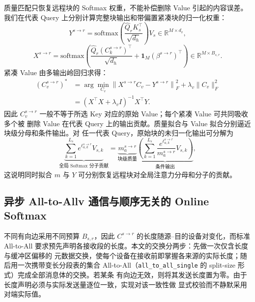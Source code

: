 \documentclass[sigconf,nonacm]{acmart}
\newcommand{\softmax}{\mathrm{softmax}}
\begin{document}
质量匹配只恢复远程块的 Softmax 权重，不能补偿删除 Value 引起的内容误差。我们在代表 Query
上分别计算完整块输出和带偏置紧凑块的归一化权重：
\begin{equation}
Y^{s \to r} = \softmax\!\left(\frac{\widehat{Q}_r K_s^\top}{\sqrt{d_h}}\right) V_s \in \mathbb{R}^{M \times d_v},
\label{eq:Y}
\end{equation}
\begin{equation}
X^{s \to r} = \softmax\!\left(\frac{\widehat{Q}_r (C_k^{s \to r})^\top}{\sqrt{d_h}} + \mathbf{1}_M (\beta^{s \to r})^\top\right) \in \mathbb{R}^{M \times B_{s,r}}.
\label{eq:X}
\end{equation}
紧凑 Value 由多输出岭回归求得：
\begin{equation}
\begin{split}
(C_v^{s \to r})^* &= \arg\min_{C_v} \left\|X^{s \to r} C_v - Y^{s \to r}\right\|_F^2
                   + \lambda_v \|C_v\|_F^2 \\
                  &= \left(X^\top X + \lambda_v I\right)^{-1} X^\top Y .
\end{split}
\label{eq:value-reg}
\end{equation}
因此 $C_v^{s \to r}$ 一般不等于所选 Key 对应的原始 Value；每个紧凑 Value 可共同吸收多个被
删除 Value 在代表 Query 上的输出贡献。质量拟合与 Value 拟合分别逼近块级分母和条件输出。对
任一代表 Query，原始块的未归一化输出可分解为
\begin{equation}
\underbrace{\sum_{k=1}^{L_s} e^{\ell_{a,k}^{s \to r}} V_{s,k}}_{\text{全局 Softmax 分子贡献}}
= \underbrace{m_a^{s \to r}}_{\text{块级质量}}
  \underbrace{\left(\sum_{k=1}^{L_s} \frac{e^{\ell_{a,k}^{s \to r}}}{m_a^{s \to r}} V_{s,k}\right)}_{\text{条件输出}},
\label{eq:decomp}
\end{equation}
这说明同时拟合 $m$ 与 $Y$ 可分别恢复远程块对全局注意力分母和分子的贡献。

\subsection{异步 All-to-Allv 通信与顺序无关的 Online Softmax}

不同有向边采用不同预算 $B_{s,r}$，因此 $C^{s \to r}$ 的长度随源--目的设备对变化，而标准
All-to-All 要求预先声明各接收段的长度。本文的交换分两步：先做一次仅含长度与缓冲区偏移的
元数据交换，使每个设备在接收前即掌握各来源的实际长度；随后用一次携带变长分段表的集合
All-to-All（\texttt{all\_to\_all\_single} 的 split-size 形式）完成全部消息体的交换。若某条
有向边无效，则将其发送长度置为零。由于长度声明必须与实际发送量逐位一致，实现对该一致性做
显式校验而不静默采用对端实际值。
\end{document}
